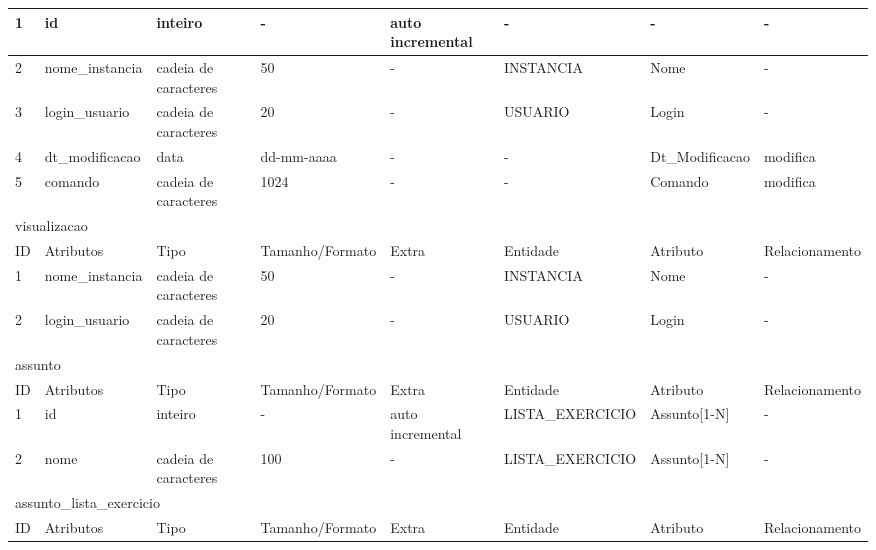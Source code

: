 \documentclass[graduacao,brazil]{ThesisPUC}
\begin{document}
\begin{table}[H]
{\begin{tabular}{|l|l|l|l|l|l|l|l|}
    1                       & id             & inteiro              & -               & auto incremental & -               & -              & -               \\ \hline
    2                       & nome\_instancia & cadeia de caracteres & 50              & -                & INSTANCIA       & Nome           & -               \\ \hline
    3                       & login\_usuario & cadeia de caracteres & 20              & -                & USUARIO         & Login          & -               \\ \hline
    4                       & dt\_modificacao & data                 & dd-mm-aaaa      & -                & -               & Dt\_Modificacao & modifica        \\ \hline
    5                       & comando        & cadeia de caracteres & 1024            & -                & -               & Comando        & modifica        \\ \hline
    \multicolumn{8}{|l|}{visualizacao} \\ \hline
    ID                      & Atributos      & Tipo                 & Tamanho/Formato & Extra            & Entidade        & Atributo       & Relacionamento  \\ \hline
    1                       & nome\_instancia & cadeia de caracteres & 50              & -                & INSTANCIA       & Nome           & -               \\ \hline
    2                       & login\_usuario & cadeia de caracteres & 20              & -                & USUARIO         & Login          & -               \\ \hline
    \multicolumn{8}{|l|}{assunto} \\ \hline
    ID                      & Atributos      & Tipo                 & Tamanho/Formato & Extra            & Entidade        & Atributo       & Relacionamento  \\ \hline
    1                       & id             & inteiro              & -               & auto incremental & LISTA\_EXERCICIO & Assunto[1-N]   & -               \\ \hline
    2                       & nome           & cadeia de caracteres & 100             & -                & LISTA\_EXERCICIO & Assunto[1-N]   & -               \\ \hline
    \multicolumn{8}{|l|}{assunto\_lista\_exercicio} \\ \hline
    ID                      & Atributos      & Tipo                 & Tamanho/Formato & Extra            & Entidade        & Atributo       & Relacionamento  \\ \hline

\end{tabular}}
\end{table}
\end{document}
